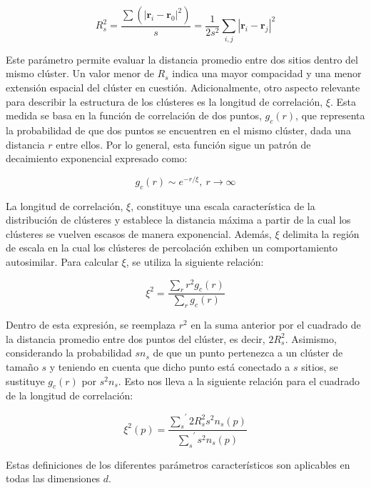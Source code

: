 \begin{equation}\label{eq:19}
R_s^2=	\frac{\sum{\left(\left| \mathbf{r}_i-\mathbf{r}_0\right|^2 \right)}}{s}=\frac{1}{2s^2}\sum_{i,j}{\left|\mathbf{r}_i-\mathbf{r}_j\right|^2}
\end{equation}

Este parámetro permite evaluar la distancia promedio entre dos sitios dentro del mismo clúster. Un valor menor de $R_s$ indica una mayor compacidad y una menor extensión espacial del clúster en cuestión. Adicionalmente, otro aspecto relevante para describir la estructura de los clústeres es la longitud de correlación, $\xi$. Esta medida se basa en la función de correlación de dos puntos, $g_c(r )$, que representa la probabilidad de que dos puntos se encuentren en el mismo clúster, dada una distancia $r$ entre ellos. Por lo general, esta función sigue un patrón de decaimiento exponencial expresado como:


\begin{equation}\label{eq:16}
g_c(r) \sim e^{-r/\xi},  \ r\to\infty
\end{equation}

La longitud de correlación, $\xi$, constituye una escala característica de la distribución de clústeres y establece la distancia máxima a partir de la cual los clústeres se vuelven escasos de manera exponencial. Además, $\xi$ delimita la región de escala en la cual los clústeres de percolación exhiben un comportamiento autosimilar. Para calcular $\xi$, se utiliza la siguiente relación:

\begin{equation}\label{eq:17}
\xi^2=\frac{\sum_r{r^2g_c(r)}}{\sum_r{g_c(r)}}
\end{equation}

Dentro de esta expresión, se reemplaza $r^2$  en la suma anterior por el cuadrado de la distancia promedio entre dos puntos del clúster, es decir, $2R_{s}^2$. Asimismo, considerando la probabilidad $sn_s$ de que un punto pertenezca a un clúster de tamaño $s$ y teniendo en cuenta que dicho punto está conectado a $s$ sitios, se sustituye $g_c(r)$ por $s^2n_s$. Esto nos lleva a la siguiente relación para el cuadrado de la longitud de correlación:

\begin{equation}\label{eq:18}
	\xi^2(p)=\frac{{\sum_s}^{\prime}{2R_{s}^2s^2n_s(p)}}{{\sum_{s}}^{\prime}{s^2n_s(p)}}
\end{equation}

Estas definiciones de los diferentes parámetros característicos son aplicables en todas las dimensiones $d$.



